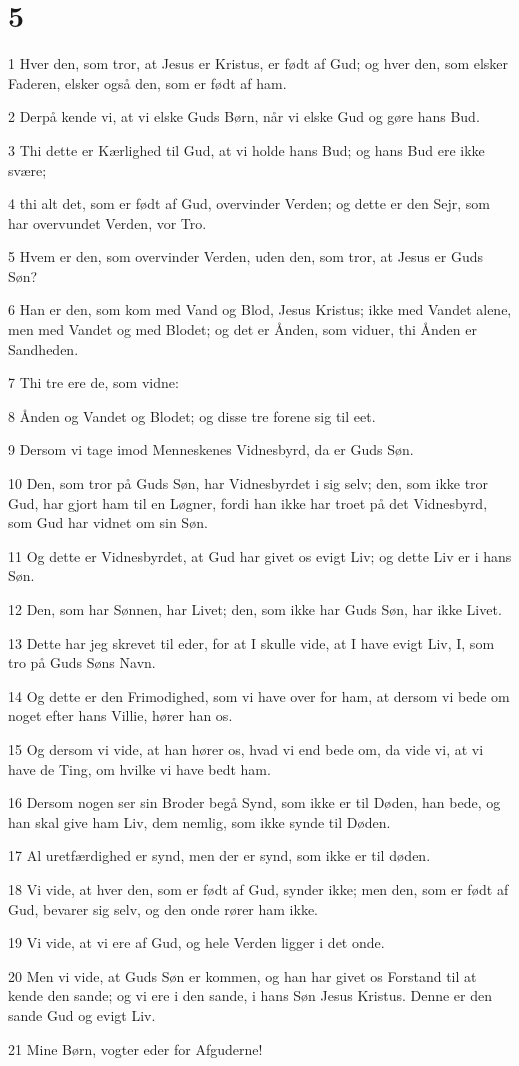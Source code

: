 \chapter{5}

\par 1 Hver den, som tror, at Jesus er Kristus, er født af Gud; og hver den, som elsker Faderen, elsker også den, som er født af ham.
\par 2 Derpå kende vi, at vi elske Guds Børn, når vi elske Gud og gøre hans Bud.
\par 3 Thi dette er Kærlighed til Gud, at vi holde hans Bud; og hans Bud ere ikke svære;
\par 4 thi alt det, som er født af Gud, overvinder Verden; og dette er den Sejr, som har overvundet Verden, vor Tro.
\par 5 Hvem er den, som overvinder Verden, uden den, som tror, at Jesus er Guds Søn?
\par 6 Han er den, som kom med Vand og Blod, Jesus Kristus; ikke med Vandet alene, men med Vandet og med Blodet; og det er Ånden, som viduer, thi Ånden er Sandheden.
\par 7 Thi tre ere de, som vidne:
\par 8 Ånden og Vandet og Blodet; og disse tre forene sig til eet.
\par 9 Dersom vi tage imod Menneskenes Vidnesbyrd, da er Guds Søn.
\par 10 Den, som tror på Guds Søn, har Vidnesbyrdet i sig selv; den, som ikke tror Gud, har gjort ham til en Løgner, fordi han ikke har troet på det Vidnesbyrd, som Gud har vidnet om sin Søn.
\par 11 Og dette er Vidnesbyrdet, at Gud har givet os evigt Liv; og dette Liv er i hans Søn.
\par 12 Den, som har Sønnen, har Livet; den, som ikke har Guds Søn, har ikke Livet.
\par 13 Dette har jeg skrevet til eder, for at I skulle vide, at I have evigt Liv, I, som tro på Guds Søns Navn.
\par 14 Og dette er den Frimodighed, som vi have over for ham, at dersom vi bede om noget efter hans Villie, hører han os.
\par 15 Og dersom vi vide, at han hører os, hvad vi end bede om, da vide vi, at vi have de Ting, om hvilke vi have bedt ham.
\par 16 Dersom nogen ser sin Broder begå Synd, som ikke er til Døden, han bede, og han skal give ham Liv, dem nemlig, som ikke synde til Døden.
\par 17 Al uretfærdighed er synd, men der er synd, som ikke er til døden.
\par 18 Vi vide, at hver den, som er født af Gud, synder ikke; men den, som er født af Gud, bevarer sig selv, og den onde rører ham ikke.
\par 19 Vi vide, at vi ere af Gud, og hele Verden ligger i det onde.
\par 20 Men vi vide, at Guds Søn er kommen, og han har givet os Forstand til at kende den sande; og vi ere i den sande, i hans Søn Jesus Kristus. Denne er den sande Gud og evigt Liv.
\par 21 Mine Børn, vogter eder for Afguderne!




